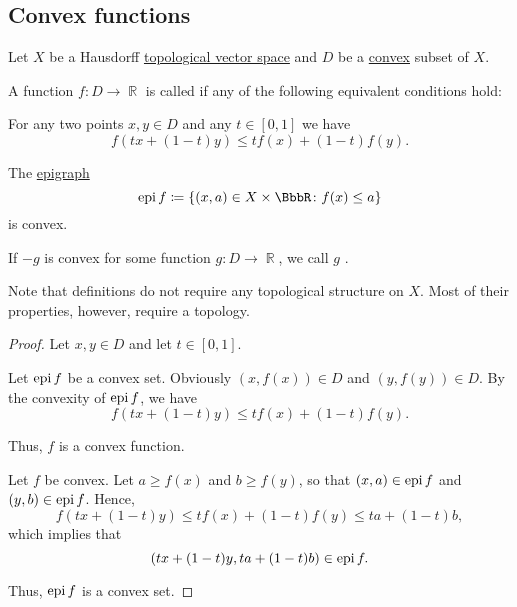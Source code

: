 \subsection{Convex functions}\label{subsec:convex_functions}

Let \( X \) be a Hausdorff \hyperref[def:topological_vector_space]{topological vector space} and \( D \) be a \hyperref[def:convex_set]{convex} subset of \( X \).

\begin{definition}\label{def:convex_functions}
  A function \( f: D \to \BbbR \) is called  if any of the following equivalent conditions hold:

  \begin{thmenum}
     For any two points \( x, y \in D \) and any \( t \in [0, 1] \) we have
    \begin{equation*}
      f(tx + (1-t)y) \leq tf(x) + (1-t)f(y).
    \end{equation*}

     The \hyperref[def:epigraph]{epigraph}
    \begin{equation*}
      \epi f \coloneqq \{ (x, a) \in X \times \BbbR \colon f(x) \leq a \}
    \end{equation*}
    is convex.
  \end{thmenum}

  If \( -g \) is convex for some function \( g: D \to \BbbR \), we call \( g \) .

  Note that definitions do not require any topological structure on \( X \). Most of their properties, however, require a topology.
\end{definition}
\begin{proof}
  Let \( x, y \in D \) and let \( t \in [0, 1] \).

   Let \( \operatorname{epi} f \) be a convex set. Obviously \( (x, f(x)) \in D \) and \( (y, f(y)) \in D \). By the convexity of \( \operatorname{epi} f \), we have
  \begin{equation*}
    f(tx + (1-t)y) \leq tf(x) + (1-t)f(y).
  \end{equation*}

  Thus, \( f \) is a convex function.

   Let \( f \) be convex. Let \( a \geq f(x) \) and \( b \geq f(y) \), so that \( (x, a) \in \operatorname{epi} f \) and \( (y, b) \in \operatorname{epi} f \). Hence,
  \begin{equation*}
    f(tx + (1-t)y) \leq tf(x) + (1-t)f(y) \leq ta + (1-t)b,
  \end{equation*}
  which implies that
  \begin{equation*}
    (tx + (1-t)y, ta + (1-t)b) \in \operatorname{epi} f.
  \end{equation*}

  Thus, \( \operatorname{epi} f \) is a convex set.
\end{proof}

